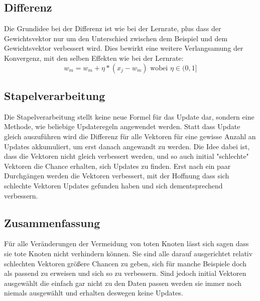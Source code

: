 \documentclass{article}
\begin{document}
\subsection{Differenz}
Die Grundidee bei der Differenz ist wie bei der Lernrate, plus dass der Gewichtsvektor nur um den Unterschied zwischen dem Beispiel und dem Gewichtsvektor verbessert wird. Dies bewirkt eine weitere Verlangsamung der Konvergenz, mit den selben Effekten wie bei der Lernrate:
\[
	w_m = w_m + \eta * (x_j - w_m) \textrm{ wobei } \eta \in (0,1]
\]

\subsection{Stapelverarbeitung}
Die Stapelverarbeitung stellt keine neue Formel für das Update dar, sondern eine Methode, wie beliebige Updateregeln angewendet werden. Statt dass Update gleich auszuführen wird die Differenz für alle Vektoren für eine gewisse Anzahl an Updates akkumuliert, um erst danach angewandt zu werden. Die Idee dabei ist, dass die Vektoren nicht gleich verbessert werden, und so auch initial "schlechte" Vektoren die Chance erhalten, sich Updates zu finden. Erst nach ein paar Durchgängen werden die Vektoren verbessert, mit der Hoffnung dass sich schlechte Vektoren Updates gefunden haben und sich dementsprechend verbessern.

\subsection{Zusammenfassung}
Für alle Veränderungen der Vermeidung von toten Knoten lässt sich sagen dass sie tote Knoten nicht verhindern können. Sie sind alle darauf ausgerichtet relativ schlechten Vektoren größere Chancen zu geben, sich für manche Beispiele doch als passend zu erweisen und sich so zu verbessern. Sind jedoch initial Vektoren ausgewählt die einfach gar nicht zu den Daten passen werden sie immer noch niemals ausgewählt und erhalten deswegen keine Updates.
\end{document}
